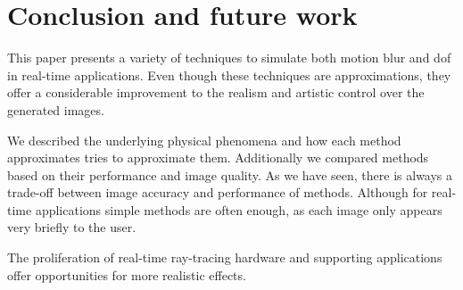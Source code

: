 \chapter{Conclusion and future work}
This paper presents a variety of techniques to simulate both motion blur and \gls{dof} in real-time applications.
Even though these techniques are approximations, they offer a considerable improvement to the realism and artistic control over the generated images.

We described the underlying physical phenomena and how each method approximates tries to approximate them.
Additionally we compared methods based on their performance and image quality.
As we have seen, there is always a trade-off between image accuracy and performance of methods.
Although for real-time applications simple methods are often enough, as each image only appears very briefly to the user.

The proliferation of real-time ray-tracing hardware and supporting applications offer opportunities for more realistic effects.
